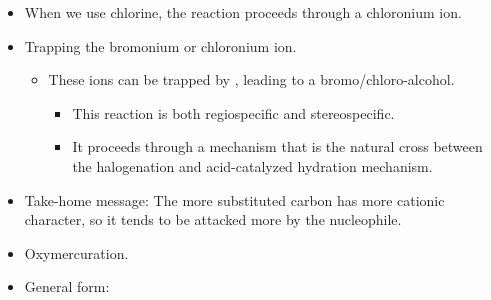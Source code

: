 \documentclass[../notes.tex]{subfiles}
\begin{document}
\begin{itemize}
\begin{figure}[h!]
\begin{subfigure}[b]{\linewidth}
                \arrow
            \schemestop
            \vspace{1em}
            \caption{Second step.}
            \label{fig:halogenationb}
        \end{subfigure}
        \caption{Halogenation mechanism.}
        \label{fig:halogenation}
    \end{figure}
    \begin{itemize}
        \item Note that in the first step, the bromonium ion will be the major contributing structure because it satisfies the octet rule and it's symmetrical. This is why we show only it in the second step.
        \item In the second step, because of the steric hindrance of the bromonium ion, the bromide ion engages in a "special attack" from the back side, resulting in the \emph{trans} geometry. Note that it can attack either carbon, not just the one shown in Figure \ref{fig:halogenationb}.
    \end{itemize}
    \item When we use chlorine, the reaction proceeds through a chloronium ion.
    \item Trapping the bromonium or chloronium ion.
    \begin{itemize}
        \item These ions can be trapped by , leading to a bromo/chloro-alcohol.
        \begin{itemize}
            \item This reaction is both regiospecific and stereospecific.
            \item It proceeds through a mechanism that is the natural cross between the halogenation and acid-catalyzed hydration mechanism.
        \end{itemize}
    \end{itemize}
    \item Take-home message: The more substituted carbon has more cationic character, so it tends to be attacked more by the nucleophile.
    \item Oxymercuration.
    \item General form:

\end{itemize}
\end{document}
